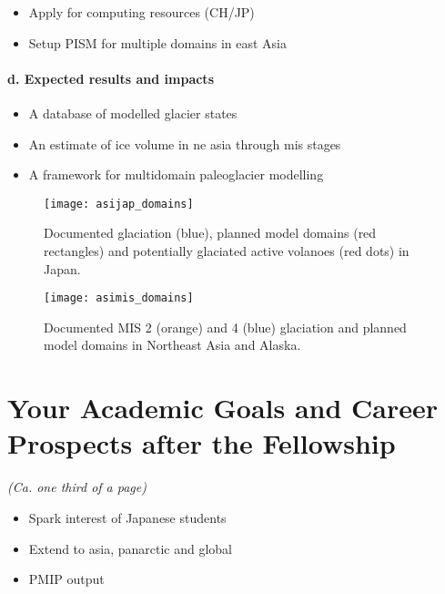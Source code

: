 \documentclass{article}
\begin{document}
    \begin{itemize}
      \item{Apply for computing resources (CH/JP)}
      \item{Setup PISM for multiple domains in east Asia}
    \end{itemize}

\paragraph{d. Expected results and impacts}

    \begin{itemize}
      \item{A database of modelled glacier states}
      \item{An estimate of ice volume in ne asia through mis stages}
      \item{A framework for multidomain paleoglacier modelling}
    \end{itemize}

    \begin{figure}
      \centerline{\texttt{[image: asijap\_domains]}}
      \caption{%
        Documented glaciation (blue), planned model domains (red rectangles)
        and potentially glaciated active volanoes (red dots) in Japan.}
      \label{fig:japan}
    \end{figure}

    \begin{figure}
      \centerline{\texttt{[image: asimis\_domains]}}
      \caption{%
        Documented MIS 2 (orange) and 4 (blue) glaciation and planned model
        domains in Northeast Asia and Alaska.}
      \label{fig:asia}
    \end{figure}


\section{Your Academic Goals and Career Prospects after the Fellowship}

    \emph{(Ca. one third of a page)}

    \begin{itemize}
      \item{Spark interest of Japanese students}
      \item{Extend to asia, panarctic and global}
      \item{PMIP output}
    \end{itemize}

\end{document}
